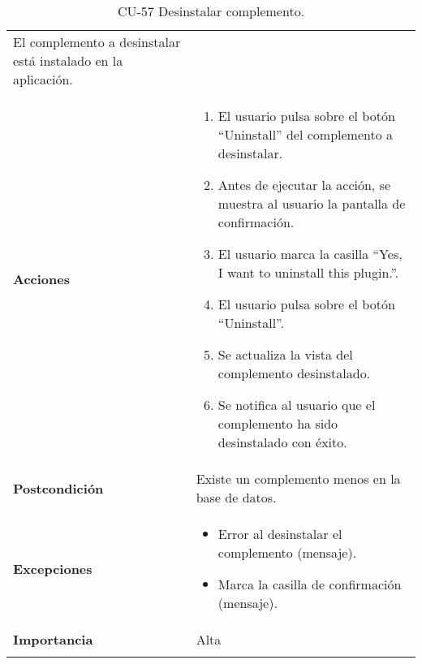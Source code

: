 \begin{longtable}[]{@{}ll@{}}
\begin{minipage}[t]{0.72\columnwidth}
El complemento a desinstalar está instalado en la aplicación.\strut
\end{minipage}\tabularnewline
\begin{minipage}[t]{0.22\columnwidth}\raggedright
\textbf{Acciones}\strut
\end{minipage} & \begin{minipage}[t]{0.72\columnwidth}\raggedright
\begin{enumerate}
\def\labelenumi{\arabic{enumi}.}
\tightlist
\item
  El usuario pulsa sobre el botón ``Uninstall'' del complemento a
  desinstalar.
\item
  Antes de ejecutar la acción, se muestra al usuario la pantalla de
  confirmación.
\item
  El usuario marca la casilla ``Yes, I want to uninstall this plugin.''.
\item
  El usuario pulsa sobre el botón ``Uninstall''.
\item
  Se actualiza la vista del complemento desinstalado.
\item
  Se notifica al usuario que el complemento ha sido desinstalado con
  éxito.
\end{enumerate}\strut
\end{minipage}\tabularnewline
\begin{minipage}[t]{0.22\columnwidth}\raggedright
\textbf{Postcondición}\strut
\end{minipage} & \begin{minipage}[t]{0.72\columnwidth}\raggedright
Existe un complemento menos en la base de datos.\strut
\end{minipage}\tabularnewline
\begin{minipage}[t]{0.22\columnwidth}\raggedright
\textbf{Excepciones}\strut
\end{minipage} & \begin{minipage}[t]{0.72\columnwidth}\raggedright
\begin{itemize}
\tightlist
\item
  Error al desinstalar el complemento (mensaje).
\item
  Marca la casilla de confirmación (mensaje).
\end{itemize}\strut
\end{minipage}\tabularnewline
\begin{minipage}[t]{0.22\columnwidth}\raggedright
\textbf{Importancia}\strut
\end{minipage} & \begin{minipage}[t]{0.72\columnwidth}\raggedright
Alta\strut
\end{minipage}\tabularnewline
\bottomrule
\caption{CU-57 Desinstalar complemento.}
\end{longtable}

